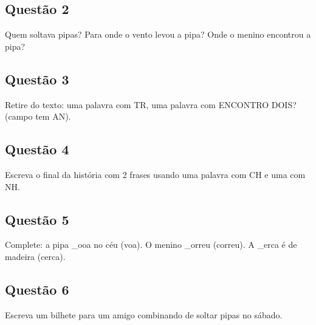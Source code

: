 \subsection*{Questão 2}
Quem soltava pipas? Para onde o vento levou a pipa? Onde o menino encontrou a pipa?

\begin{center}
  \underline{\hspace{12cm}}
\end{center}

\subsection*{Questão 3}
Retire do texto: uma palavra com TR, uma palavra com ENCONTRO DOIS? (campo tem AN).

\begin{center}
  \underline{\hspace{12cm}}
\end{center}

\subsection*{Questão 4}
Escreva o final da história com 2 frases usando uma palavra com CH e uma com NH.

\begin{center}
  \underline{\hspace{12cm}}
\end{center}

\subsection*{Questão 5}
Complete: a pipa \_ooa no céu (voa). O menino \_orreu (correu). A \_erca é de madeira (cerca).

\begin{center}
  \underline{\hspace{12cm}}
\end{center}

\subsection*{Questão 6}
Escreva um bilhete para um amigo combinando de soltar pipas no sábado.

\begin{center}
  \underline{\hspace{12cm}}
\end{center}

